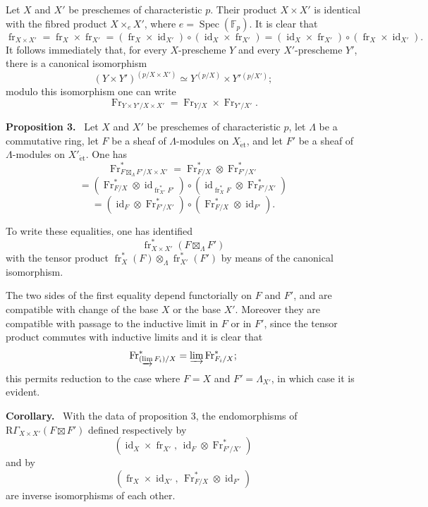 \documentclass[11pt]{article}
\newenvironment{statement}[1]{\par\medskip\noindent\textbf{#1.}\ }{\par\medskip}
\DeclareMathOperator{\Spec}{Spec}
\providecommand{\et}{\mathrm{\acute{e}t}}
\providecommand{\RGamma}{\mathrm R\Gamma}
\providecommand{\id}{\operatorname{id}}
\providecommand{\id}{\operatorname{id}}
\providecommand{\id}{\operatorname{id}}
\providecommand{\RGamma}{\mathrm R\Gamma}
\providecommand{\id}{\operatorname{id}}
\providecommand{\Spec}{\operatorname{Spec}}
\providecommand{\Spec}{\operatorname{Spec}}
\providecommand{\id}{\operatorname{id}}
\providecommand{\Spec}{\operatorname{Spec}}
\providecommand{\fr}{\operatorname{fr}}
\providecommand{\Fr}{\operatorname{Fr}}
\providecommand{\Fr}{\operatorname{Fr}}
\providecommand{\fr}{\operatorname{fr}}
\providecommand{\Spec}{\operatorname{Spec}}
\providecommand{\id}{\operatorname{id}}
\providecommand{\RGamma}{\mathrm R\Gamma}
\providecommand{\et}{\acute{e}t}
\providecommand{\boxt}{\boxtimes}
\begin{document}
Let $X$ and $X'$ be preschemes of characteristic $p$. Their product $X\times X'$ is identical with the fibred product $X\times_eX'$, where $e=\Spec(\mathbb F_p)$. It is clear that
\[
\fr_{X\times X'}=\fr_X\times\fr_{X'}=(\fr_X\times\id_{X'})\circ(\id_X\times\fr_{X'})
=(\id_X\times\fr_{X'})\circ(\fr_X\times\id_{X'}).
\]
It follows immediately that, for every $X$-prescheme $Y$ and every $X'$-prescheme $Y'$, there is a canonical isomorphism
\[
(Y\times Y')^{(p/X\times X')}
\simeq Y^{(p/X)}\times Y'{}^{(p/X')};
\]
modulo this isomorphism one can write
\[
\Fr_{Y\times Y'/X\times X'}=\Fr_{Y/X}\times\Fr_{Y'/X'}.
\]

\begin{statement}{Proposition 3}
Let $X$ and $X'$ be preschemes of characteristic $p$, let $\Lambda$ be a commutative ring, let $F$ be a sheaf of $\Lambda$-modules on $X_{\et}$, and let $F'$ be a sheaf of $\Lambda$-modules on $X'_{\et}$. One has
\[
\Fr^*_{F\boxt_\Lambda F'/X\times X'}
=\Fr^*_{F/X}\otimes\Fr^*_{F'/X'}
\]
\[
=(\Fr^*_{F/X}\otimes\id_{\fr_{X'}^*F'})\circ
(\id_{\fr_X^*F}\otimes\Fr^*_{F'/X'})
\]
\[
=(\id_F\otimes\Fr^*_{F'/X'})\circ
(\Fr^*_{F/X}\otimes\id_{F'}).
\]
\end{statement}

To write these equalities, one has identified
\[
\fr_{X\times X'}^*(F\boxt_\Lambda F')
\]
with the tensor product $\fr_X^*(F)\otimes_\Lambda\fr_{X'}^*(F')$ by means of the canonical isomorphism.

The two sides of the first equality depend functorially on $F$ and $F'$, and are compatible with change of the base $X$ or the base $X'$. Moreover they are compatible with passage to the inductive limit in $F$ or in $F'$, since the tensor product commutes with inductive limits and it is clear that
\[
\Fr^*_{(\varinjlim F_i)/X}=\varinjlim\Fr^*_{F_i/X};
\]
this permits reduction to the case where $F=X$ and $F'=\Lambda_{X'}$, in which case it is evident.

\begin{statement}{Corollary}
With the data of proposition 3, the endomorphisms of $\RGamma_{X\times X'}(F\boxt F')$ defined respectively by
\[
(\id_X\times\fr_{X'},\,\id_F\otimes\Fr^*_{F'/X'})
\]
and by
\[
(\fr_X\times\id_{X'},\,\Fr^*_{F/X}\otimes\id_{F'})
\]
are inverse isomorphisms of each other.
\end{statement}
\end{document}
